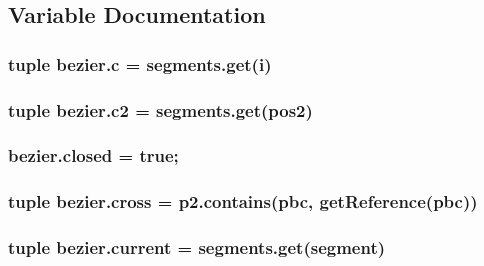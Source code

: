 \subsection{Variable Documentation}
\hypertarget{namespacebezier_acdfb18e445ac8e833eda8fb411fe7373}{}
\subsubsection[{c}]{\setlength{\rightskip}{0pt plus 5cm}tuple bezier.\+c = segments.\+get({\bf i})}\label{namespacebezier_acdfb18e445ac8e833eda8fb411fe7373}
\hypertarget{namespacebezier_a508894c735abb837df1774cee031b231}{}
\subsubsection[{c2}]{\setlength{\rightskip}{0pt plus 5cm}tuple bezier.\+c2 = segments.\+get(pos2)}\label{namespacebezier_a508894c735abb837df1774cee031b231}
\hypertarget{namespacebezier_a9df8c553fbf62057af742910a55bda90}{}
\subsubsection[{closed}]{\setlength{\rightskip}{0pt plus 5cm}bezier.\+closed = true;}\label{namespacebezier_a9df8c553fbf62057af742910a55bda90}
\hypertarget{namespacebezier_a01a1f8683e5f9f801018e651c0de1abc}{}
\subsubsection[{cross}]{\setlength{\rightskip}{0pt plus 5cm}tuple bezier.\+cross = p2.\+contains({\bf pbc}, get\+Reference({\bf pbc}))}\label{namespacebezier_a01a1f8683e5f9f801018e651c0de1abc}
\hypertarget{namespacebezier_afea563cafd3cc59f5602af082de31682}{}
\subsubsection[{current}]{\setlength{\rightskip}{0pt plus 5cm}tuple bezier.\+current = segments.\+get({\bf segment})}\label{namespacebezier_afea563cafd3cc59f5602af082de31682}
\hypertarget{namespacebezier_a58fa425c725113cb9f5504c6c3603dec}{}
